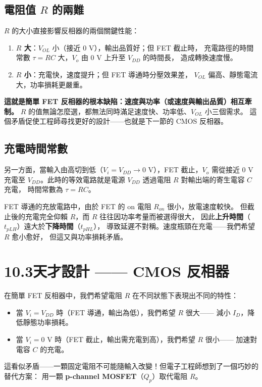 \documentclass[12pt]{article}
\begin{document}
\subsection*{電阻值 $R$ 的兩難}

$R$ 的大小直接影響反相器的兩個關鍵性能：

\begin{enumerate}[leftmargin=2.2em,itemsep=2pt]
  \item \textbf{$R$ 大}：$V_{OL}$ 小（接近 0 V），輸出品質好；但 FET 截止時，
    充電路徑的時間常數 $\tau = RC$ 大，$V_o$ 由 0 V 上升至 $V_{DD}$ 的時間長，
    造成轉換速度慢。
  \item \textbf{$R$ 小}：充電快，速度提升；但 FET 導通時分壓效果差，
    $V_{OL}$ 偏高、靜態電流大，功率損耗更嚴重。
\end{enumerate}

\textbf{這就是簡單 FET 反相器的根本缺陷：速度與功率（或速度與輸出品質）相互牽制。}
$R$ 的值無論怎麼選，都無法同時滿足速度快、功率低、$V_{OL}$ 小三個需求。
這個矛盾促使工程師尋找更好的設計——也就是下一節的 CMOS 反相器。

\subsection*{充電時間常數}

另一方面，當輸入由高切到低（$V_i = V_{DD} \to 0$ V），FET 截止，$V_o$ 需從接近 0 V
充電至 $V_{DD}$。此時的等效電路就是電源 $V_{DD}$ 透過電阻 $R$ 對輸出端的寄生電容 $C$ 充電，
時間常數為 $\tau = RC$。

FET 導通的充放電路中，由於 FET 的 on 電阻 $R_{on}$ 很小，放電速度較快。
但截止後的充電完全仰賴 $R$，而 $R$ 往往因功率考量而被選得很大，
因此\textbf{上升時間}（$t_{pLH}$）遠大於\textbf{下降時間}（$t_{pHL}$），
導致延遲不對稱。速度瓶頸在充電——我們希望 $R$ 愈小愈好，
但這又與功率損耗矛盾。

\section*{10.3\quad 天才設計 —— CMOS 反相器}

\begin{keybox}
在簡單 FET 反相器中，我們希望電阻 $R$ 在不同狀態下表現出不同的特性：
\begin{itemize}[leftmargin=2.2em,itemsep=2pt]
  \item 當 $V_i = V_{DD}$ 時（FET 導通，輸出為低），我們希望 $R$ 很大——
    減小 $I_D$，降低靜態功率損耗。
  \item 當 $V_i = 0$ V 時（FET 截止，輸出需充電到高），我們希望 $R$ 很小——
    加速對電容 $C$ 的充電。
\end{itemize}

這看似矛盾——一顆固定電阻不可能隨輸入改變！但電子工程師想到了一個巧妙的替代方案：
用一顆 \textbf{p-channel MOSFET}（$Q_p$）取代電阻 $R$。
\end{keybox}
\end{document}
